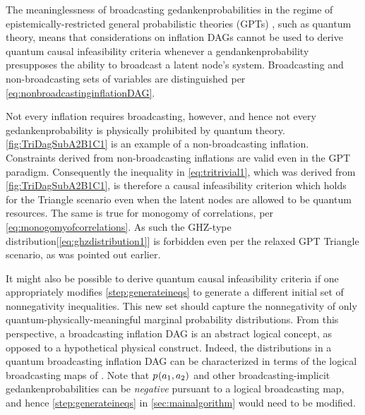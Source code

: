 The meaninglessness of broadcasting gedankenprobabilities in the regime of epistemically-restricted general probabilistic theories (GPTs) \cite{SpekkensToyTheory,NoCloningGeneral2006,Barnum2012GPT,Janotta2014GPT}, such as quantum theory, means that considerations on inflation DAGs cannot be used to derive quantum causal infeasibility criteria whenever a gendankenprobability presupposes the ability to broadcast a latent node's system. Broadcasting and non-broadcasting sets of variables are distinguished per \cref{eq:nonbroadcastinginflationDAG}.


Not every inflation requires broadcasting, however, and hence not every gedankenprobability is physically prohibited by quantum theory. 
\cref{fig:TriDagSubA2B1C1} is an example of a non-broadcasting inflation.
Constraints derived from non-broadcasting inflations are valid even in the GPT paradigm. Consequently the inequality in \cref{eq:tritrivial1}, which was derived from \cref{fig:TriDagSubA2B1C1}, is therefore a causal infeasibility criterion which holds for the Triangle scenario even when the latent nodes are allowed to be quantum resources. The same is true for monogomy of correlations, per \cref{eq:monogomyofcorrelations}. As such the GHZ-type distribution[\cref{eq:ghzdistribution1}] is forbidden even per the relaxed GPT Triangle scenario, as was pointed out earlier. 

It might also be possible to derive quantum causal infeasibility criteria if one appropriately modifies \cref{step:generateineqs} to generate a different initial set of nonnegativity inequalities. This new set should capture the nonnegativity of only quantum-physically-meaningful marginal probability distributions. From this perspective, a broadcasting inflation DAG is an abstract logical concept, as opposed to a hypothetical physical construct. Indeed, the distributions in a quantum broadcasting inflation DAG can be characterized in terms of the logical broadcasting maps of \citet{Coecke2011}. Note that ${p_{}}\lparen a_1,a_2\rparen$ and other broadcasting-implicit gedankenprobabilities can be \emph{negative} pursuant to a logical broadcasting map, and hence \cref{step:generateineqs} in \cref{sec:mainalgorithm} would need to be modified.

